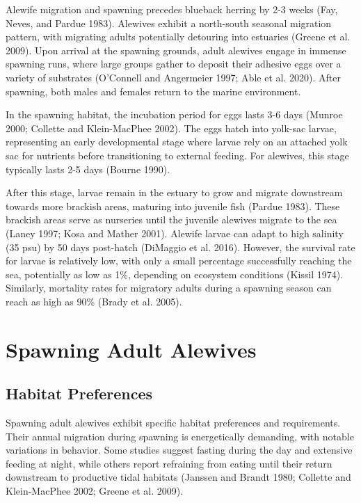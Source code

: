 \documentclass[
]{book}
\begin{document}
Alewife migration and spawning precedes blueback herring by 2-3 weeks (Fay, Neves, and Pardue 1983). Alewives exhibit a north-south seasonal migration pattern, with migrating adults potentially detouring into estuaries (Greene et al. 2009). Upon arrival at the spawning grounds, adult alewives engage in immense spawning runs, where large groups gather to deposit their adhesive eggs over a variety of substrates (O'Connell and Angermeier 1997; Able et al. 2020). After spawning, both males and females return to the marine environment.

In the spawning habitat, the incubation period for eggs lasts 3-6 days (Munroe 2000; Collette and Klein-MacPhee 2002). The eggs hatch into yolk-sac larvae, representing an early developmental stage where larvae rely on an attached yolk sac for nutrients before transitioning to external feeding. For alewives, this stage typically lasts 2-5 days (Bourne 1990).

After this stage, larvae remain in the estuary to grow and migrate downstream towards more brackish areas, maturing into juvenile fish (Pardue 1983). These brackish areas serve as nurseries until the juvenile alewives migrate to the sea (Laney 1997; Kosa and Mather 2001). Alewife larvae can adapt to high salinity (35 psu) by 50 days post-hatch (DiMaggio et al. 2016). However, the survival rate for larvae is relatively low, with only a small percentage successfully reaching the sea, potentially as low as 1\%, depending on ecosystem conditions (Kissil 1974). Similarly, mortality rates for migratory adults during a spawning season can reach as high as 90\% (Brady et al. 2005).

\hypertarget{spawning-adult-alewives}{%
\section{Spawning Adult Alewives}\label{spawning-adult-alewives}}

\hypertarget{habitat-preferences}{%
\subsection{Habitat Preferences}\label{habitat-preferences}}

Spawning adult alewives exhibit specific habitat preferences and requirements. Their annual migration during spawning is energetically demanding, with notable variations in behavior. Some studies suggest fasting during the day and extensive feeding at night, while others report refraining from eating until their return downstream to productive tidal habitats (Janssen and Brandt 1980; Collette and Klein-MacPhee 2002; Greene et al. 2009).
\end{document}
